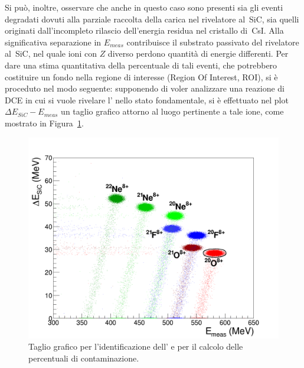 Si può, inoltre, osservare che anche in questo caso sono presenti sia gli eventi degradati dovuti alla parziale raccolta della carica nel rivelatore al~SiC, sia quelli originati dall'incompleto rilascio dell'energia residua nel cristallo di~CsI.
Alla significativa separazione in $E_{meas}$ contribuisce il substrato passivato del rivelatore al~SiC, nel quale ioni con $Z$ diverso perdono quantità di energie differenti.
Per dare una stima quantitativa della percentuale di tali eventi, che potrebbero costituire un fondo nella regione di interesse (Region Of Interest, ROI), si è proceduto nel modo seguente: supponendo di voler analizzare una reazione di DCE in cui si vuole rivelare l' nello stato fondamentale, si è effettuato nel plot $\Delta E_{SiC} - E_{meas}$ un taglio grafico attorno al luogo pertinente a tale ione, come mostrato in Figura~\ref{fig:deltaE_Emeas_taglio}.
\begin{figure} [!p]
	\centering
	\includegraphics[width=\textwidth, keepaspectratio]{Grafici_Tesi2/PIDnew/deltaE_Emeas_quadrata_taglio_menoeventi.png}
	\caption{Taglio grafico per l'identificazione dell' e per il calcolo delle percentuali di contaminazione.} \label{fig:deltaE_Emeas_taglio}
\end{figure}
